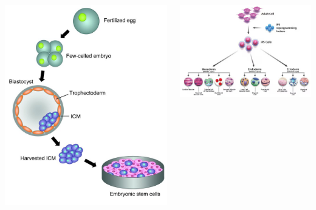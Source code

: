 \documentclass[20pt,margin=1in,innermargin=-4.5in,blockverticalspace=-0.25in]{tikzposter}
\begin{document}
\begin{columns}
{         \begin{tikzfigure}
            \includegraphics[width=0.5\linewidth]{JCI0423065.f1.jpg}
        \end{tikzfigure}

        \begin{tikzfigure}
            \includegraphics[width=0.7\linewidth]{ipsc-pathway.jpg}
        \end{tikzfigure}
        
    }


\end{columns}
\end{document}
